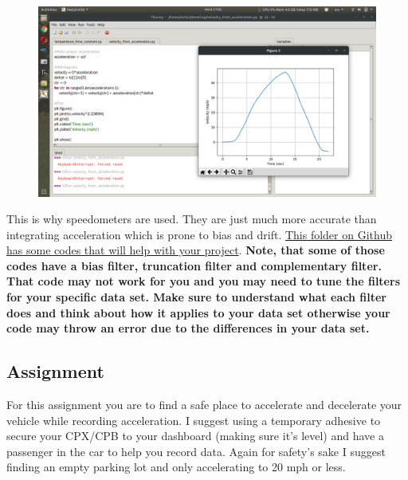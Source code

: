 \begin{figure}[H]
  \begin{center}
    \includegraphics[width=\textwidth]{Figures/accelerometer_integration.png}
  \end{center}
\end{figure}
This is why speedometers are used. They are just much more accurate than integrating acceleration which is prone to bias and drift. \href{https://github.com/cmontalvo251/Python/tree/master/instrumentation/cpx_assignments/Velocity_from_Acceleration}{This folder on Github has some codes that will help with your project}. {\bf Note, that some of those codes have a bias filter, truncation filter and complementary filter. That code may not work for you and you may need to tune the filters for your specific data set. Make sure to understand what each filter does and think about how it applies to your data set otherwise your code may throw an error due to the differences in your data set.}

\subsection{Assignment}

For this assignment you are to find a safe place to accelerate and decelerate your vehicle while recording acceleration. I suggest using a temporary adhesive to secure your CPX/CPB to your dashboard (making sure it's level) and have a passenger in the car to help you record data. Again for safety's sake I suggest finding an empty parking lot and only accelerating to 20 mph or less.



